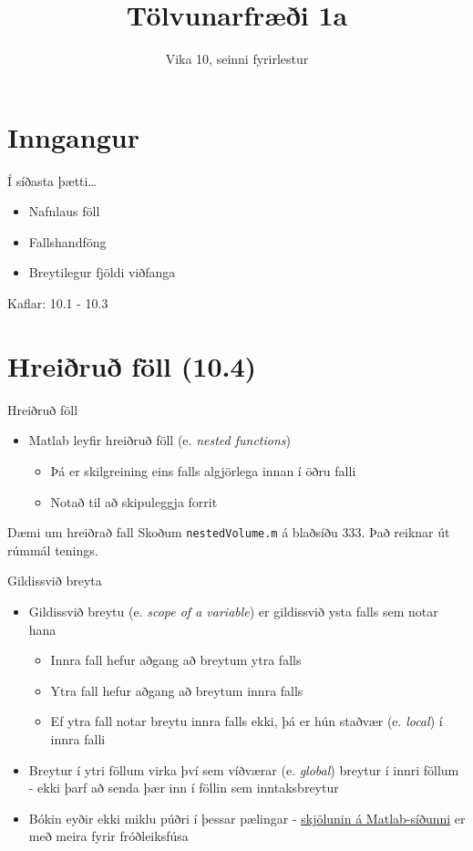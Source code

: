 \documentclass{beamer}
\title{Tölvunarfræði 1a}
\subtitle{Vika 10, seinni fyrirlestur}
\begin{document}
\begin{frame}
\titlepage
\end{frame}

\section{Inngangur}

\begin{frame}{Í síðasta þætti\ldots}
\begin{itemize}
 \item Nafnlaus föll
 \item Fallshandföng
 \item Breytilegur fjöldi viðfanga
\end{itemize}
Kaflar: 10.1 - 10.3 
\end{frame}

\section{Hreiðruð föll (10.4)}

\begin{frame}{Hreiðruð föll}
\begin{itemize}
 \item Matlab leyfir hreiðruð föll (e. \emph{nested functions})
 \begin{itemize}
  \item Þá er skilgreining eins falls algjörlega innan í öðru falli
  \item Notað til að skipuleggja forrit
 \end{itemize}
\end{itemize}
\end{frame}

\begin{frame}[fragile]{Dæmi um hreiðrað fall}
Skoðum \texttt{nestedVolume.m} á blaðsíðu 333. Það reiknar út rúmmál tenings.
\end{frame}


\begin{frame}{Gildissvið breyta}
\vspace{\baselineskip}
\begin{itemize}
 \item Gildissvið breytu (e. \emph{scope of a variable}) er gildissvið ysta falls sem notar hana
 \begin{itemize}
  \item Innra fall hefur aðgang að breytum ytra falls
  \item Ytra fall hefur aðgang að breytum innra falls
  \item Ef ytra fall notar breytu innra falls ekki, þá er hún staðvær (e. \emph{local}) í innra falli
 \end{itemize}
 \item Breytur í ytri föllum virka því sem víðværar (e. \emph{global}) breytur í innri föllum - ekki þarf að senda þær inn í föllin sem inntaksbreytur
 \item Bókin eyðir ekki miklu púðri í þessar pælingar - \href{http://se.mathworks.com/help/matlab/matlab_prog/nested-functions.html?refresh=true}{skjölunin á Matlab-síðunni} er með meira fyrir fróðleiksfúsa
\end{itemize}
\end{frame}
\end{document}
